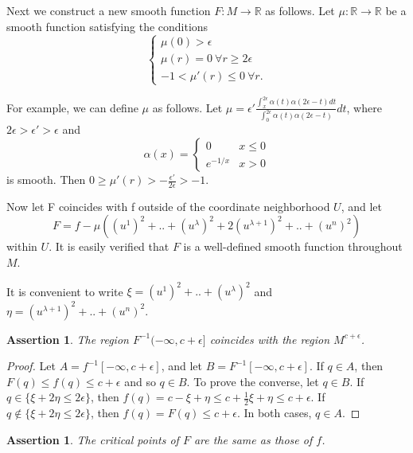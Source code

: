 \documentclass[a4paper,11pt,reqno]{amsart}
\newtheorem{asser}[thm]{Assertion}
\newcommand{\RR}{\mathbb{R}}      %
\begin{document}
Next we construct a new smooth function $F : M \to \RR$ as follows. Let $\mu
:\RR \to \RR$ be a smooth function satisfying the conditions
\begin{equation}
  \begin{cases}
    \mu(0) > \epsilon \\
    \mu(r) = 0 \: \forall r \ge 2\epsilon \\
    -1 < \mu'(r) \le 0 \: \forall r.
  \end{cases}
\end{equation}

For example, we can define $\mu$ as follows. Let $\mu = \epsilon'
\frac{\int_x^{2\epsilon} \alpha(t)\alpha(2\epsilon-t)dt}{\int_0^{2\epsilon}
  \alpha(t)\alpha(2\epsilon-t)}dt$, where $2\epsilon > \epsilon' > \epsilon$ and
\begin{equation}
  \alpha(x) =
  \begin{cases}
    0 & x \le 0 \\
    e^{-1/x} & x > 0
  \end{cases}
\end{equation}
is smooth. Then $0 \ge \mu'(r) > -\frac{\epsilon'}{2\epsilon} > -1$.

Now let F coincides with f outside of the coordinate neighborhood $U$, and let
\begin{equation}
  F = f -\mu((u^1)^2+..+(u^{\lambda})^2 + 2(u^{\lambda+1})^2+..+(u^{n})^2)
\end{equation}
within $U$. It is easily verified that $F$ is a well-defined smooth function
throughout $M$.

It is convenient to write $\xi = (u^1)^2+..+(u^{\lambda})^2$ and $\eta =
(u^{\lambda+1})^2+..+(u^{n})^2$.

\begin{asser}
  The region $F^{-1}(-\infty, c+\epsilon]$ coincides with the region
  $M^{c+\epsilon}$.
\end{asser}

\begin{proof}
  Let $A = f^{-1}[-\infty, c+\epsilon]$, and let $B = F^{-1}[-\infty,
  c+\epsilon]$. If $q \in A$, then $F(q) \le f(q) \le c+\epsilon$ and so $q \in
  B$. To prove the converse, let $q \in B$. If $q \in \{ \xi + 2\eta \le
  2\epsilon \}$, then $f(q) = c - \xi + \eta \le c+ \frac{1}{2}\xi + \eta \le
  c+\epsilon$. If $q \notin \{ \xi + 2\eta \le 2\epsilon \}$, then $f(q) =
  F(q) \le c+\epsilon$. In both cases, $q \in A$.
\end{proof}

\begin{asser}
  The critical points of $F$ are the same as those of $f$.
\end{asser}
\end{document}
